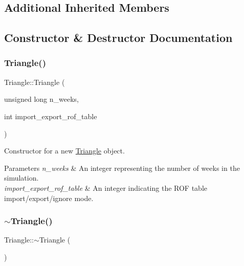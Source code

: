 \subsection*{Additional Inherited Members}


\subsection{Constructor \& Destructor Documentation}
\mbox{\label{classTriangle_a24833bad242ddc3f671b36678dff5738}} 
\subsubsection{\texorpdfstring{Triangle()}{Triangle()}}
{\footnotesize\ttfamily Triangle\+::\+Triangle (\begin{DoxyParamCaption}\item[{unsigned long}]{n\+\_\+weeks,  }\item[{int}]{import\+\_\+export\+\_\+rof\+\_\+table }\end{DoxyParamCaption})}



Constructor for a new \mbox{\hyperlink{classTriangle}{Triangle}} object. 


\begin{DoxyParams}{Parameters}
{\em n\+\_\+weeks} & An integer representing the number of weeks in the simulation. \\
\hline
{\em import\+\_\+export\+\_\+rof\+\_\+table} & An integer indicating the R\+OF table import/export/ignore mode. \\
\hline
\end{DoxyParams}
\mbox{\label{classTriangle_a5199760a17454f4dc94c855a57e3a152}} 
\subsubsection{\texorpdfstring{$\sim$\+Triangle()}{~Triangle()}}
{\footnotesize\ttfamily Triangle\+::$\sim$\+Triangle (\begin{DoxyParamCaption}{ }\end{DoxyParamCaption})}



